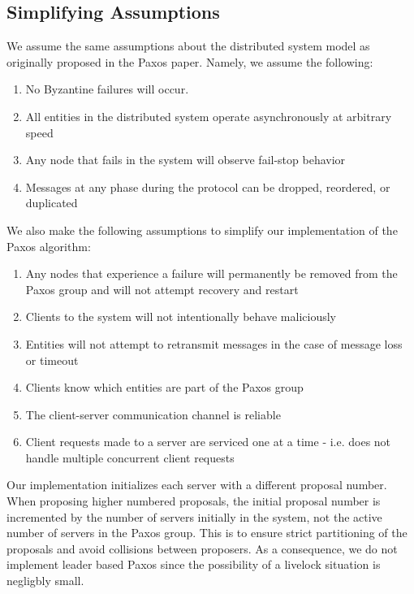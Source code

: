 \documentclass{article}
\begin{document}
\subsection{Simplifying Assumptions}

We assume the same assumptions about the distributed system model as originally proposed in the Paxos paper. Namely, we assume the following:

\begin{enumerate}
\item No Byzantine failures will occur.
\item All entities in the distributed system operate asynchronously at arbitrary speed
\item Any node that fails in the system will observe fail-stop behavior
\item Messages at any phase during the protocol can be dropped, reordered, or duplicated
\end{enumerate}

We also make the following assumptions to simplify our implementation of the Paxos algorithm:

\begin{enumerate}
\item Any nodes that experience a failure will permanently be removed from the Paxos group and will not attempt recovery and restart
\item Clients to the system will not intentionally behave maliciously
\item Entities will not attempt to retransmit messages in the case of message loss or timeout
\item Clients know which entities are part of the Paxos group
\item The client-server communication channel is reliable
\item Client requests made to a server are serviced one at a time - i.e. does not handle multiple concurrent client requests
\end{enumerate}

Our implementation initializes each server with a different proposal number. 
When proposing higher numbered proposals, the initial proposal number is incremented by the number of servers initially in the system, not the active number of servers in the Paxos group.
This is to ensure strict partitioning of the proposals and avoid collisions between proposers.
As a consequence, we do not implement leader based Paxos since the possibility of a livelock situation is negligbly small.
\end{document}
